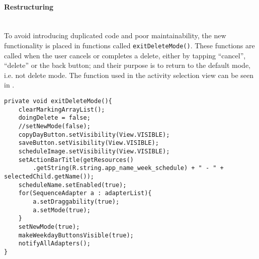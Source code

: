 \paragraph{Restructuring} \hfill\\ 
To avoid introducing duplicated code and poor maintainability, the new functionality is placed in functions called \texttt{exitDeleteMode()}.
These functions are called when the user cancels or completes a delete, either by tapping \enquote{cancel}, \enquote{delete} or the back button;
and their purpose is to return to the default mode, i.e. not delete mode.
The function used in the activity selection view can be seen in .

\begin{lstlisting}[caption={The \texttt{exitDeleteMode()} function, which returns the application to the default mode}, label={lst:exitdeletemode}]
private void exitDeleteMode(){
    clearMarkingArrayList();
    doingDelete = false;
    //setNewMode(false);
    copyDayButton.setVisibility(View.VISIBLE);
    saveButton.setVisibility(View.VISIBLE);
    scheduleImage.setVisibility(View.VISIBLE);
    setActionBarTitle(getResources()
        .getString(R.string.app_name_week_schedule) + " - " + selectedChild.getName());
    scheduleName.setEnabled(true);
    for(SequenceAdapter a : adapterList){
        a.setDraggability(true);
        a.setMode(true);
    }
    setNewMode(true);
    makeWeekdayButtonsVisible(true);
    notifyAllAdapters();
}
\end{lstlisting}
